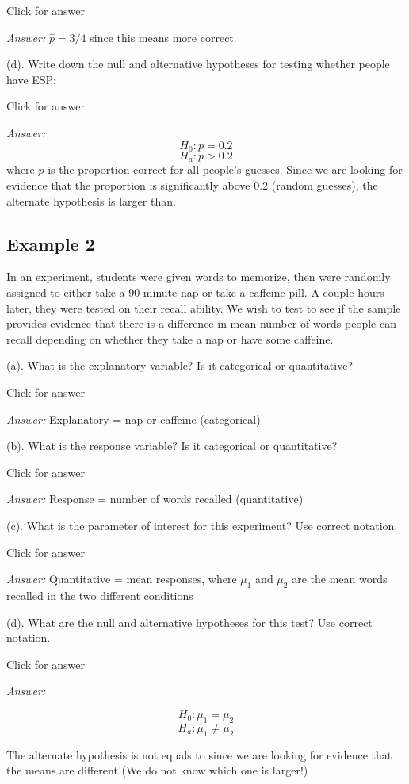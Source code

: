 \documentclass[
]{book}
\begin{document}
Click for answer

\emph{Answer:}
\(\hat{p} = 3/4\) since this means more correct.

(d). Write down the null and alternative hypotheses for testing whether people have ESP:

Click for answer

\emph{Answer:}
\[H_0: p = 0.2\]
\[H_a: p > 0.2\]
where \(p\) is the proportion correct for all people's guesses. Since we are looking for evidence that the proportion is significantly above 0.2 (random guesses), the alternate hypothesis is larger than.

\hypertarget{example-2}{%
\subsection{Example 2}\label{example-2}}

In an experiment, students were given words to memorize, then were randomly assigned to either take a 90 minute nap or take a caffeine pill. A couple hours later, they were tested on their recall ability. We wish to test to see if the sample provides evidence that there is a difference in mean number of words people can recall depending on whether they take a nap or have some caffeine.

(a). What is the explanatory variable? Is it categorical or quantitative?

Click for answer

\emph{Answer:} Explanatory = nap or caffeine (categorical)

(b). What is the response variable? Is it categorical or quantitative?

Click for answer

\emph{Answer:} Response = number of words recalled (quantitative)

(c). What is the parameter of interest for this experiment? Use correct notation.

Click for answer

\emph{Answer:}
Quantitative = mean responses, where \(\mu_1\) and \(\mu_2\) are the mean words recalled in the two different conditions

(d). What are the null and alternative hypotheses for this test? Use correct notation.

Click for answer

\emph{Answer:}

\[H_0: \mu_1 = \mu_2\]
\[H_a: \mu_1 \neq \mu_2\]

The alternate hypothesis is not equals to since we are looking for evidence that the means are different (We do not know which one is larger!)
\end{document}
